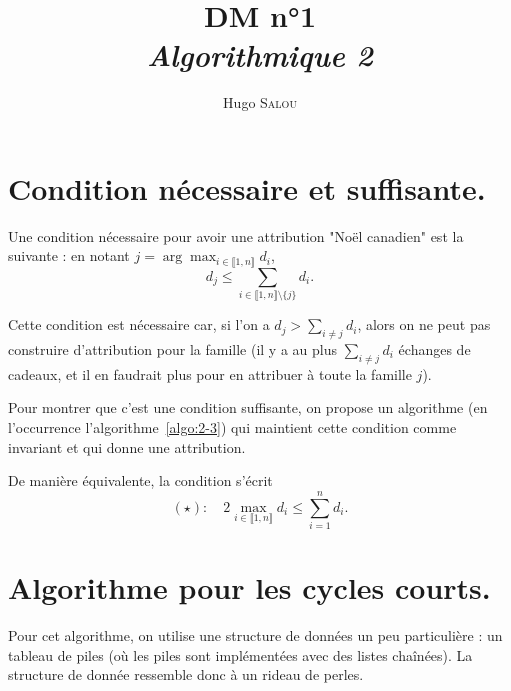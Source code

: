 \documentclass{../../notes}
\title{DM n°1\\[-0.3em] \itshape Algorithmique 2}
\author{Hugo \scshape Salou}
\begin{document}
  \maketitle

  \chapter{Condition nécessaire et suffisante.}

  Une condition nécessaire pour avoir une attribution "Noël canadien" est la suivante :
  en notant $j = \arg\max_{i \in \llbracket 1,n\rrbracket  } d_i$, \[
  d_j \le  \sum_{i \in \llbracket 1,n\rrbracket \setminus \{j\}} d_i
  .\]

  Cette condition est nécessaire car, si l'on a $d_j > \sum_{i \neq j} d_i$, alors on ne peut pas construire d'attribution pour la famille (il y a au plus $\sum_{i \neq j} d_i$ échanges de cadeaux, et il en faudrait plus pour en attribuer à toute la famille $j$).

  Pour montrer que c'est une condition suffisante, on propose un algorithme (en l'occurrence l'algorithme~\ref{algo:2-3}) qui maintient cette condition comme invariant et qui donne une attribution.

  De manière équivalente, la condition s'écrit \[
    (\star) :  \quad 2 \max_{i \in \llbracket 1,n\rrbracket} d_i \le \sum_{i=1}^n d_i
  .\] 


  \chapter{Algorithme pour les cycles courts.}

  Pour cet algorithme, on utilise une structure de données un peu particulière : un tableau de piles (où les piles sont implémentées avec des listes chaînées).
  La structure de donnée ressemble donc à un rideau de perles.
\end{document}
